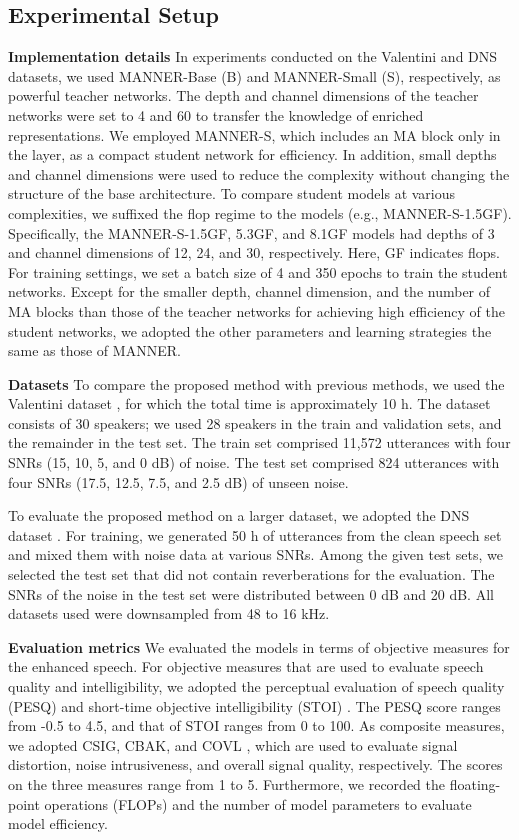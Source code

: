\documentclass[a4paper]{article}
\begin{document}
\subsection{Experimental Setup}
\textbf{Implementation details} In experiments conducted on the Valentini and DNS datasets, we used MANNER-Base (B) and MANNER-Small (S), respectively, as powerful teacher networks. The depth and channel dimensions of the teacher networks were set to 4 and 60 to transfer the knowledge of enriched representations. We employed MANNER-S, which includes an MA block only in the  layer, as a compact student network for efficiency. In addition, small depths and channel dimensions were used to reduce the complexity without changing the structure of the base architecture. To compare student models at various complexities, we suffixed the flop regime to the models (e.g., MANNER-S-1.5GF). Specifically, the MANNER-S-1.5GF, 5.3GF, and 8.1GF models had depths of 3 and channel dimensions of 12, 24, and 30, respectively. Here, GF indicates  flops. For training settings, we set a batch size of 4 and 350 epochs to train the student networks. Except for the smaller depth, channel dimension, and the number of MA blocks than those of the teacher networks for achieving high efficiency of the student networks, we adopted the other parameters and learning strategies the same as those of MANNER.

\noindent\textbf{Datasets}
To compare the proposed method with previous methods, we used the Valentini dataset \cite{valentini2017noisy}, for which the total time is approximately 10 h. The dataset consists of 30 speakers; we used 28 speakers in the train and validation sets, and the remainder in the test set. The train set comprised 11,572 utterances with four SNRs (15, 10, 5, and 0 dB) of noise. The test set comprised 824 utterances with four SNRs (17.5, 12.5, 7.5, and 2.5 dB) of unseen noise.

To evaluate the proposed method on a larger dataset, we adopted the DNS dataset \cite{reddy2020interspeech}. For training, we generated 50 h of utterances from the clean speech set and mixed them with noise data at various SNRs. Among the given test sets, we selected the test set that did not contain reverberations for the evaluation. The SNRs of the noise in the test set were distributed between 0 dB and 20 dB. All datasets used were downsampled from 48 to 16 kHz.

\noindent\textbf{Evaluation metrics}
We evaluated the models in terms of objective measures for the enhanced speech. For objective measures that are used to evaluate speech quality and intelligibility, we adopted the perceptual evaluation of speech quality (PESQ) \cite{recommendation2001perceptual} and short-time objective intelligibility (STOI) \cite{taal2011algorithm}. The PESQ score ranges from -0.5 to 4.5, and that of STOI ranges from 0 to 100. As composite measures, we adopted CSIG, CBAK, and COVL \cite{hu2007evaluation}, which are used to evaluate signal distortion, noise intrusiveness, and overall signal quality, respectively. The scores on the three measures range from 1 to 5. Furthermore, we recorded the floating-point operations (FLOPs) and the number of model parameters to evaluate model efficiency.
\end{document}
